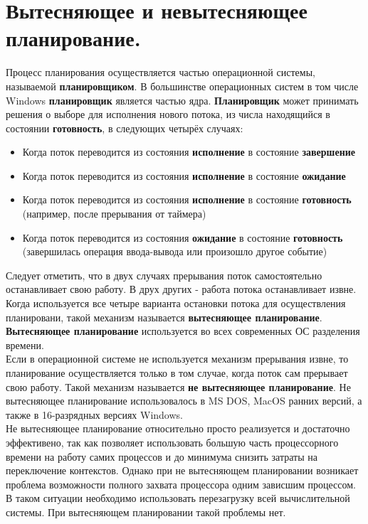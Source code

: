 \documentclass[a4paper]{article}
\begin{document}
\section{Вытесняющее и невытесняющее планирование.}
\setcounter{subsection}{0}
Процесс планирования осуществляется частью операционной системы, называемой \textbf{планировщиком}. В большинстве операционных систем в том числе Windows \textbf{планировщик} является частью ядра. \textbf{Планировщик} может принимать решения о выборе для исполнения нового потока, из числа находящийся в состоянии \textbf{готовность}, в следующих четырёх случаях:
\begin{itemize}
        \item Когда поток переводится из состояния \textbf{исполнение} в состояние \textbf{завершение}
	\item Когда поток переводится из состояния \textbf{исполнение} в состояние \textbf{ожидание}
        \item Когда поток переводится из состояния \textbf{исполнение} в состояние \textbf{готовность} (например, после прерывания от таймера)	
        \item Когда поток переводится из состояния \textbf{ожидание} в состояние \textbf{готовность} (завершилась операция ввода-вывода или произошло другое событие)
\end{itemize}
Следует отметить, что в двух случаях прерывания поток самостоятельно останавливает свою работу. В друх других - работа потока останавливает извне.\\
Когда используется все четыре варианта остановки потока для осуществления планировани, такой механизм называется \textbf{вытесняющее планирование}. \textbf{Вытесняющее планирование} используется во всех современных ОС разделения времени.\\
Если в операционной системе не используется механизм прерывания извне, то планирование осуществляется только в том случае, когда поток сам прерывает свою работу. Такой механизм называется \textbf{не вытесняющее планирование}. 
Не вытесняющее планирование использовалось в MS DOS, MacOS ранних версий, а также в 16-разрядных версиях Windows.\\
Не вытесняющее планирование относительно просто реализуется и достаточно эффективено, так как позволяет использовать большую часть процессорного времени на работу самих процессов и до минимума снизить затраты на переключение контекстов. Однако при не вытесняющем планировании возникает проблема возможности полного захвата процессора одним зависшим процессом. В таком ситуации необходимо использовать перезагрузку всей вычислительной системы. При вытесняющем планировании такой проблемы нет.\\
\end{document}
